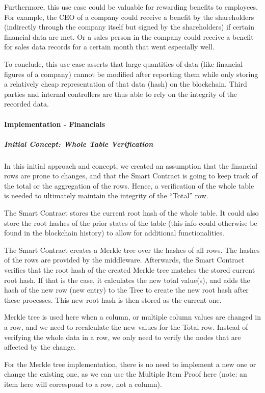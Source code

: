Furthermore, this use case could be valuable for rewarding benefits to employees. For example, the CEO of a company could receive a benefit by the shareholders (indirectly through the company itself but signed by the shareholders) if certain financial data are met. Or a sales person in the company could receive a benefit for sales data records for a certain month that went especially well.

To conclude, this use case asserts that large quantities of data (like financial figures of a company) cannot be modified after reporting them while only storing a relatively cheap representation of that data (hash) on the blockchain. Third parties and internal controllers are thus able to rely on the integrity of the recorded data.

\paragraph{Implementation - Financials}
\subparagraph{Initial Concept: Whole Table Verification}

In this initial approach and concept, we created an assumption that the financial rows are prone to changes, and that the Smart Contract is going to keep track of the total or the aggregation of the rows. Hence, a verification of the whole table is needed to ultimately maintain the integrity of the “Total” row.

The Smart Contract stores the current root hash of the whole table. It could also store the root hashes of the prior states of the table (this info could otherwise be found in the blockchain history) to allow for additional functionalities.

The Smart Contract creates a Merkle tree over the hashes of all rows. The hashes of the rows are provided by the middleware. Afterwards, the Smart Contract verifies that the root hash of the created Merkle tree matches the stored current root hash. If that is the case, it calculates the new total value(s), and adds the hash of the new row (new entry) to the Tree to create the new root hash after these processes. This new root hash is then stored as the current one.

Merkle tree is used here when a column, or multiple column values are changed in a row, and we need to recalculate the new values for the Total row. Instead of verifying the whole data in a row, we only need to verify the nodes that are affected by the change.

For the Merkle tree implementation, there is no need to implement a new one or change the existing one, as we can use the Multiple Item Proof here (note: an item here will correspond to a row, not a column).

